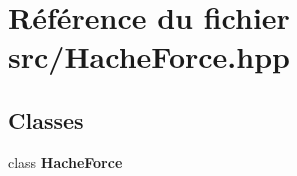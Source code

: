 \section{Référence du fichier src/\-Hache\-Force.hpp}
\label{_hache_force_8hpp}
\subsection*{Classes}
\begin{DoxyCompactItemize}
\item 
class {\bf Hache\-Force}
\end{DoxyCompactItemize}
